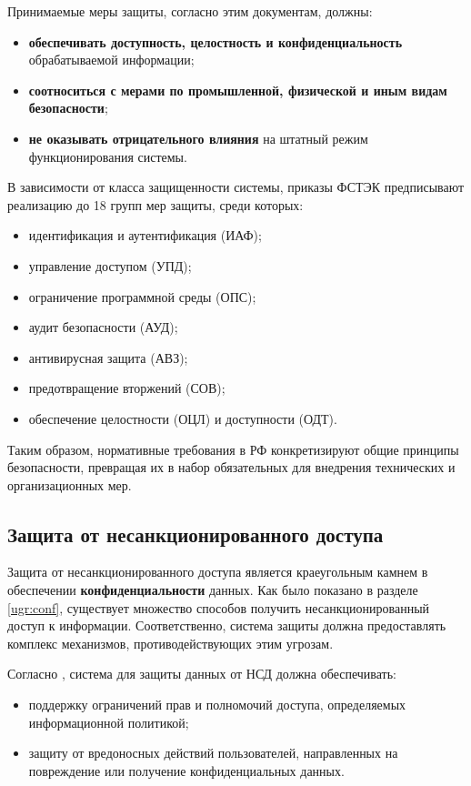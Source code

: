 Принимаемые меры защиты, согласно этим документам, должны:
\begin{itemize}
    \item \textbf{обеспечивать доступность, целостность и конфиденциальность} обрабатываемой информации;
    \item \textbf{соотноситься с мерами по промышленной, физической и иным видам безопасности};
    \item \textbf{не оказывать отрицательного влияния} на штатный режим функционирования системы.
\end{itemize}

В зависимости от класса защищенности системы, приказы ФСТЭК предписывают реализацию до 18 групп мер защиты, среди которых:
\begin{itemize}
    \item идентификация и аутентификация (ИАФ);
    \item управление доступом (УПД);
    \item ограничение программной среды (ОПС);
    \item аудит безопасности (АУД);
    \item антивирусная защита (АВЗ);
    \item предотвращение вторжений (СОВ);
    \item обеспечение целостности (ОЦЛ) и доступности (ОДТ).
\end{itemize}
Таким образом, нормативные требования в РФ конкретизируют общие принципы безопасности, превращая их в набор обязательных для внедрения технических и организационных мер.

\subsection{Защита от несанкционированного доступа}
Защита от несанкционированного доступа является краеугольным камнем в обеспечении \textbf{конфиденциальности} данных. Как было показано в разделе \ref{ugr:conf}, существует множество способов получить несанкционированный доступ к информации. Соответственно, система защиты должна предоставлять комплекс механизмов, противодействующих этим угрозам.

Согласно \autocite[с. 11]{Skakun}, система для защиты данных от НСД должна обеспечивать:
\begin{itemize}
	\item поддержку ограничений прав и полномочий доступа, определяемых информационной политикой;
	\item защиту от вредоносных действий пользователей, направленных на повреждение или получение конфиденциальных данных.
\end{itemize}

